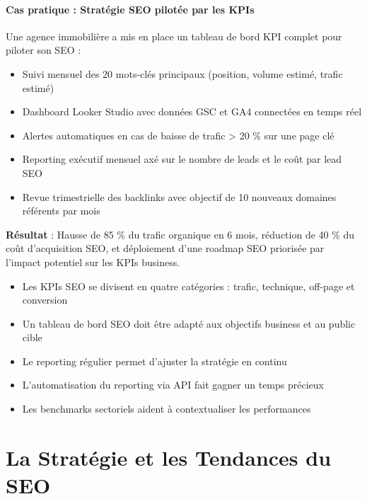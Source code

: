 \documentclass[12pt,a4paper,twoside]{report}
\begin{document}
\subsection{Cas pratique : Stratégie SEO pilotée par les KPIs}

Une agence immobilière a mis en place un tableau de bord KPI complet pour piloter son SEO :
\begin{itemize}
    \item Suivi mensuel des 20 mots-clés principaux (position, volume estimé, trafic estimé)
    \item Dashboard Looker Studio avec données GSC et GA4 connectées en temps réel
    \item Alertes automatiques en cas de baisse de trafic > 20 \% sur une page clé
    \item Reporting exécutif mensuel axé sur le nombre de leads et le coût par lead SEO
    \item Revue trimestrielle des backlinks avec objectif de 10 nouveaux domaines référents par mois
\end{itemize}
\textbf{Résultat} : Hausse de 85 \% du trafic organique en 6 mois, réduction de 40 \% du coût d'acquisition SEO, et déploiement d'une roadmap SEO priorisée par l'impact potentiel sur les KPIs business.

\begin{takeaways}
\begin{itemize}
    \item Les KPIs SEO se divisent en quatre catégories : trafic, technique, off-page et conversion
    \item Un tableau de bord SEO doit être adapté aux objectifs business et au public cible
    \item Le reporting régulier permet d'ajuster la stratégie en continu
    \item L'automatisation du reporting via API fait gagner un temps précieux
    \item Les benchmarks sectoriels aident à contextualiser les performances
\end{itemize}
\end{takeaways}


\part{La Stratégie et les Tendances du SEO}
\label{part:strategie}
\end{document}
